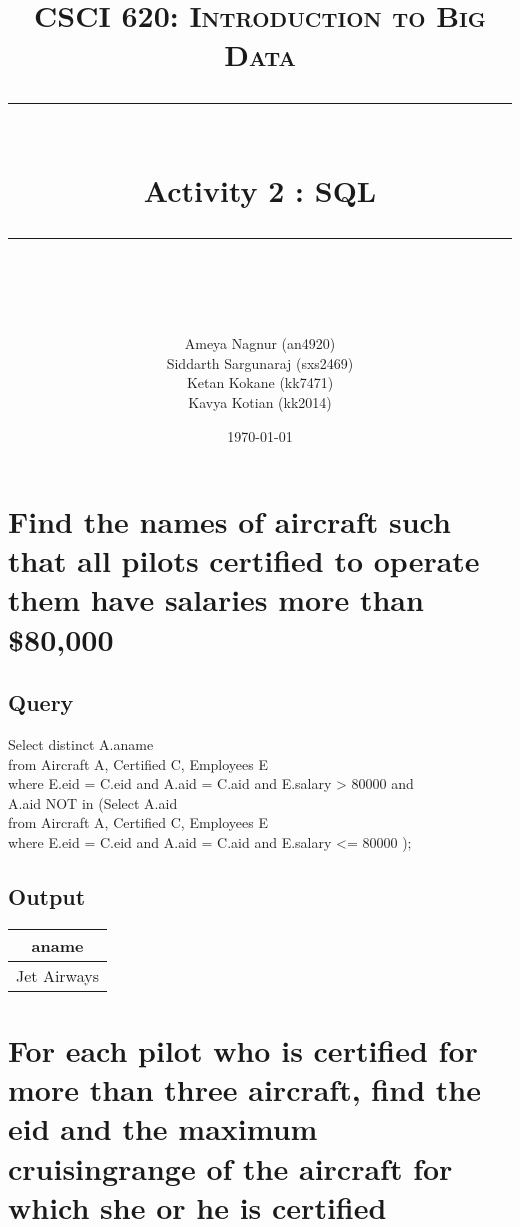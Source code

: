 \documentclass[11pt]{scrartcl} %
\title{	
	\normalfont\normalsize
	\textsc{CSCI 620: Introduction to Big Data}\\ %
	\vspace{5pt} %
	\rule{\linewidth}{0.5pt}\\ %
	\vspace{20pt} %
	{\huge Activity 2 : SQL}\\ %
	\vspace{12pt} %
	\rule{\linewidth}{2pt}\\ %
	\vspace{12pt} %
}
\author{\LARGE Ameya Nagnur (an4920)\\ \LARGE Siddarth Sargunaraj (sxs2469)\\ \LARGE Ketan Kokane (kk7471)\\ \LARGE Kavya Kotian (kk2014)} %
\date{\normalsize\today} %
\begin{document}
\maketitle %


\section{Find the names of aircraft such that all pilots certified to operate them have salaries more than \$80,000 }

\subsection{Query}
Select distinct A.aname\\
from Aircraft A, Certified C, Employees E \\
where E.eid = C.eid and A.aid = C.aid and E.salary > 80000 and \\\hspace*{10mm}A.aid NOT in
(Select A.aid\\
\hspace*{10mm}from Aircraft A, Certified C, Employees E \\
\hspace*{10mm}where E.eid = C.eid and A.aid = C.aid and E.salary <= 80000 );

\subsection{Output}
\begin{left}
\begin{tabular}{ | c | }
\hline
\textbf{aname} \\
\hline
Jet Airways \\
\hline

\end{tabular}
\end{left}

\section{For each pilot who is certified for more than three aircraft, find the eid and the maximum cruisingrange  of the aircraft for which she or he is certified }
\end{document}
